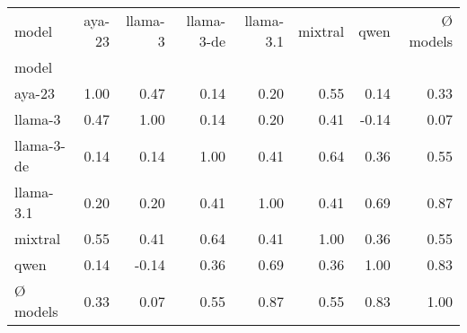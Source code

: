 \begin{tabular}{lrrrrrrr}
\toprule
model & aya-23 & llama-3 & llama-3-de & llama-3.1 & mixtral & qwen & Ø models \\
model &  &  &  &  &  &  &  \\
\midrule
aya-23 & 1.00 & 0.47 & 0.14 & 0.20 & 0.55 & 0.14 & 0.33 \\
llama-3 & 0.47 & 1.00 & 0.14 & 0.20 & 0.41 & -0.14 & 0.07 \\
llama-3-de & 0.14 & 0.14 & 1.00 & 0.41 & 0.64 & 0.36 & 0.55 \\
llama-3.1 & 0.20 & 0.20 & 0.41 & 1.00 & 0.41 & 0.69 & 0.87 \\
mixtral & 0.55 & 0.41 & 0.64 & 0.41 & 1.00 & 0.36 & 0.55 \\
qwen & 0.14 & -0.14 & 0.36 & 0.69 & 0.36 & 1.00 & 0.83 \\
Ø models & 0.33 & 0.07 & 0.55 & 0.87 & 0.55 & 0.83 & 1.00 \\
\bottomrule
\end{tabular}

